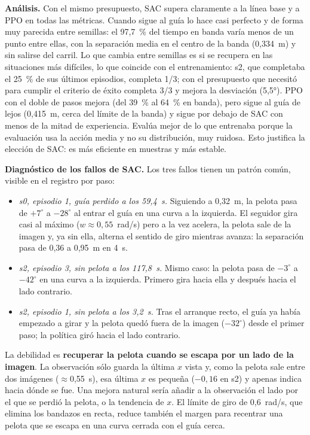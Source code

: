 \documentclass[11pt,a4paper]{article}
\begin{document}
\textbf{Análisis.} Con el mismo presupuesto, SAC supera claramente a la línea base y a PPO en todas las métricas.
Cuando sigue al guía lo hace casi perfecto y de forma muy parecida entre semillas: el 97,7~\% del tiempo en banda
varía menos de un punto entre ellas, con la separación media en el centro de la banda (0,334~m) y sin salirse del
carril. Lo que cambia entre semillas es si se recupera en las situaciones más difíciles, lo que coincide con el
entrenamiento: s2, que completaba el 25~\% de sus últimos episodios, completa 1/3; con el presupuesto que
necesitó para cumplir el criterio de éxito completa 3/3 y mejora la desviación (5,5°). PPO con el doble de pasos
mejora (del 39~\% al 64~\% en banda), pero sigue al guía de lejos (0,415~m, cerca del límite de la banda) y sigue
por debajo de SAC con menos de la mitad de experiencia. Evalúa mejor de lo que entrenaba porque la evaluación usa
la acción media y no su distribución, muy ruidosa. Esto justifica la elección de SAC: es más eficiente en
muestras y más estable.

\textbf{Diagnóstico de los fallos de SAC.} Los tres fallos tienen un patrón común, visible en el registro por paso:
\begin{itemize}
\item \emph{s0, episodio 1, guía perdido a los 59,4~s.} Siguiendo a 0,32~m, la pelota pasa de $+7^{\circ}$ a
$-28^{\circ}$ al entrar el guía en una curva a la izquierda. El seguidor gira casi al máximo ($w\approx0{,}55$~rad/s)
pero a la vez acelera, la pelota sale de la imagen y, ya sin ella, alterna el sentido de giro mientras avanza: la
separación pasa de 0,36 a 0,95~m en 4~s.
\item \emph{s2, episodio 3, sin pelota a los 117,8~s.} Mismo caso: la pelota pasa de $-3^{\circ}$ a $-42^{\circ}$ en una curva a
la izquierda. Primero gira hacia ella y después hacia el lado contrario.
\item \emph{s2, episodio 1, sin pelota a los 3,2~s.} Tras el arranque recto, el guía ya había empezado a girar y la
pelota quedó fuera de la imagen ($-32^{\circ}$) desde el primer paso; la política giró hacia el lado contrario.
\end{itemize}
La debilidad es \textbf{recuperar la pelota cuando se escapa por un lado de la imagen}. La observación sólo
guarda la última $x$ vista y, como la pelota sale entre dos imágenes ($\approx$0,55~s), esa última $x$ es pequeña
($-0{,}16$ en s2) y apenas indica hacia dónde se fue. Una mejora natural sería añadir a la observación el lado por
el que se perdió la pelota, o la tendencia de $x$. El límite de giro de 0,6~rad/s, que elimina los bandazos en
recta, reduce también el margen para recentrar una pelota que se escapa en una curva cerrada con el guía cerca.
\end{document}
